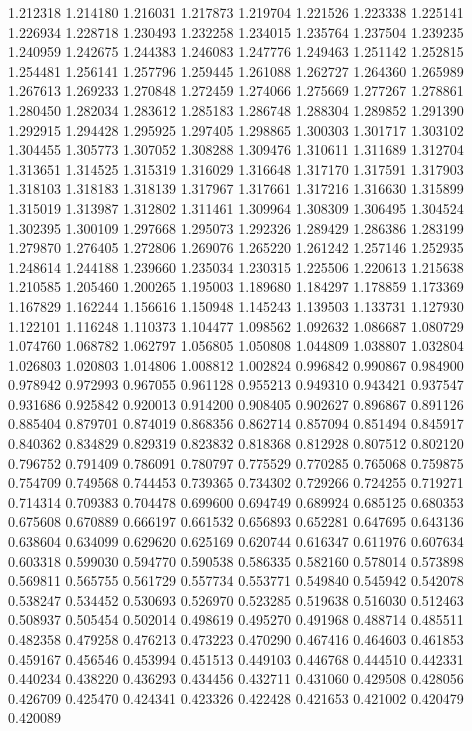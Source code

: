 1.212318
1.214180
1.216031
1.217873
1.219704
1.221526
1.223338
1.225141
1.226934
1.228718
1.230493
1.232258
1.234015
1.235764
1.237504
1.239235
1.240959
1.242675
1.244383
1.246083
1.247776
1.249463
1.251142
1.252815
1.254481
1.256141
1.257796
1.259445
1.261088
1.262727
1.264360
1.265989
1.267613
1.269233
1.270848
1.272459
1.274066
1.275669
1.277267
1.278861
1.280450
1.282034
1.283612
1.285183
1.286748
1.288304
1.289852
1.291390
1.292915
1.294428
1.295925
1.297405
1.298865
1.300303
1.301717
1.303102
1.304455
1.305773
1.307052
1.308288
1.309476
1.310611
1.311689
1.312704
1.313651
1.314525
1.315319
1.316029
1.316648
1.317170
1.317591
1.317903
1.318103
1.318183
1.318139
1.317967
1.317661
1.317216
1.316630
1.315899
1.315019
1.313987
1.312802
1.311461
1.309964
1.308309
1.306495
1.304524
1.302395
1.300109
1.297668
1.295073
1.292326
1.289429
1.286386
1.283199
1.279870
1.276405
1.272806
1.269076
1.265220
1.261242
1.257146
1.252935
1.248614
1.244188
1.239660
1.235034
1.230315
1.225506
1.220613
1.215638
1.210585
1.205460
1.200265
1.195003
1.189680
1.184297
1.178859
1.173369
1.167829
1.162244
1.156616
1.150948
1.145243
1.139503
1.133731
1.127930
1.122101
1.116248
1.110373
1.104477
1.098562
1.092632
1.086687
1.080729
1.074760
1.068782
1.062797
1.056805
1.050808
1.044809
1.038807
1.032804
1.026803
1.020803
1.014806
1.008812
1.002824
0.996842
0.990867
0.984900
0.978942
0.972993
0.967055
0.961128
0.955213
0.949310
0.943421
0.937547
0.931686
0.925842
0.920013
0.914200
0.908405
0.902627
0.896867
0.891126
0.885404
0.879701
0.874019
0.868356
0.862714
0.857094
0.851494
0.845917
0.840362
0.834829
0.829319
0.823832
0.818368
0.812928
0.807512
0.802120
0.796752
0.791409
0.786091
0.780797
0.775529
0.770285
0.765068
0.759875
0.754709
0.749568
0.744453
0.739365
0.734302
0.729266
0.724255
0.719271
0.714314
0.709383
0.704478
0.699600
0.694749
0.689924
0.685125
0.680353
0.675608
0.670889
0.666197
0.661532
0.656893
0.652281
0.647695
0.643136
0.638604
0.634099
0.629620
0.625169
0.620744
0.616347
0.611976
0.607634
0.603318
0.599030
0.594770
0.590538
0.586335
0.582160
0.578014
0.573898
0.569811
0.565755
0.561729
0.557734
0.553771
0.549840
0.545942
0.542078
0.538247
0.534452
0.530693
0.526970
0.523285
0.519638
0.516030
0.512463
0.508937
0.505454
0.502014
0.498619
0.495270
0.491968
0.488714
0.485511
0.482358
0.479258
0.476213
0.473223
0.470290
0.467416
0.464603
0.461853
0.459167
0.456546
0.453994
0.451513
0.449103
0.446768
0.444510
0.442331
0.440234
0.438220
0.436293
0.434456
0.432711
0.431060
0.429508
0.428056
0.426709
0.425470
0.424341
0.423326
0.422428
0.421653
0.421002
0.420479
0.420089
